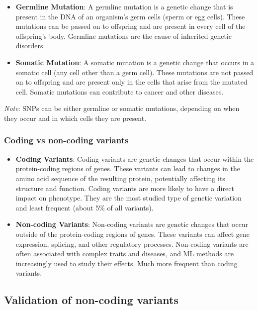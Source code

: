 \documentclass[a4paper]{article}
\begin{document}
\begin{itemize}
  \item \textbf{Germline Mutation}: A germline mutation is a genetic change that
  is present in the DNA of an organism's germ cells (sperm or egg cells).
  These mutations can be passed on to offspring and are present in every cell
  of the offspring's body. Germline mutations are the cause of inherited genetic
  disorders.
  
  \item \textbf{Somatic Mutation}: A somatic mutation is a genetic change that
  occurs in a somatic cell (any cell other than a germ cell). These mutations
  are not passed on to offspring and are present only in the cells that arise
  from the mutated cell. Somatic mutations can contribute to cancer and other
  diseases.
\end{itemize}

\textit{Note}: SNPs can be either germline or somatic mutations, depending on
when they occur and in which cells they are present.

\subsubsection*{Coding vs non-coding variants}

\begin{itemize}
  \item \textbf{Coding Variants}: Coding variants are genetic changes that occur
  within the protein-coding regions of genes. These variants can lead to changes
  in the amino acid sequence of the resulting protein, potentially affecting its
  structure and function. Coding variants are more likely to have a direct impact
  on phenotype. They are the most studied type of genetic variation and least
  frequent (about 5\% of all variants).
  
  \item \textbf{Non-coding Variants}: Non-coding variants are genetic changes that
  occur outside of the protein-coding regions of genes. These variants can affect
  gene expression, splicing, and other regulatory processes. Non-coding variants
  are often associated with complex traits and diseases, and ML methods are
  increasingly used to study their effects. Much more frequent than coding variants.

\end{itemize}

\subsection*{Validation of non-coding variants}
\end{document}
